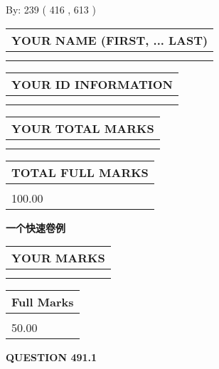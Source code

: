 \documentclass{ctexart}
\begin{document}
   
\hspace{1.0in} By: 
 239 ( 416 ,  613 )
   
   
   
   
\newpage 
\setcounter{page}{ 
   491001 } 
   
   
   
   
\noindent\begin{tabular}{|l|}
\hline
YOUR NAME (FIRST, ... LAST)  \\
\hline
 \\ 
 \\ 
\hline
\end{tabular}
\hspace{0.05in} \begin{tabular}{|l|}
\hline
 YOUR   ID   INFORMATION  \\
\hline
 \\ 
 \\ 
\hline
\end{tabular}
   
   
\vspace{0.2in}\noindent\begin{tabular}{|l|}
\hline
YOUR TOTAL MARKS  \\
\hline
 \\ 
 \\ 
\hline
\end{tabular}
\hspace{0.05in} \begin{tabular}{|l|}
\hline
TOTAL FULL MARKS  \\
\hline
 \\ 
100.00 \\
\hline
\end{tabular}
   
   
 \vspace{0.2in}
{\LARGE {\textbf{ 一个快速卷例}}}
   
   
  
\vspace{0.2in}
  
\noindent\begin{tabular}{|l|}
\hline
 YOUR MARKS  \\
\hline
 \\ 
 \\ 
\hline
\end{tabular}
\hspace{0.05in} \begin{tabular}{|l|}
\hline
 Full Marks  \\
\hline
 \\ 
50.00 \\
\hline
\end{tabular}
{\textbf{\Large{QUESTION
491.1 
}}}
  
\end{document}
